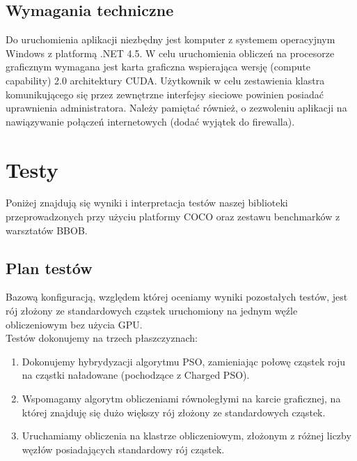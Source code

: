 \documentclass[12pt, twoside, openany, abstract=on]{report}
\theoremstyle{definition}
\begin{document}
\section{Wymagania techniczne}

Do uruchomienia aplikacji niezbędny jest komputer z systemem operacyjnym Windows z
platformą .NET 4.5. W celu uruchomienia obliczeń na procesorze graficznym wymagana jest karta graficzna wspierająca wersję (compute capability) 2.0 architektury CUDA.
Użytkownik w celu zestawienia klastra komunikującego się przez zewnętrzne interfejsy sieciowe powinien posiadać uprawnienia administratora. Należy pamiętać również, o zezwoleniu aplikacji na nawiązywanie połączeń internetowych (dodać wyjątek do firewalla).


\chapter{Testy}

Poniżej znajdują się wyniki i interpretacja testów naszej biblioteki przeprowadzonych przy użyciu platformy COCO oraz zestawu benchmarków z warsztatów BBOB.

\section{Plan testów}
Bazową konfiguracją, względem której oceniamy wyniki pozostałych testów, jest rój złożony ze standardowych cząstek uruchomiony na jednym węźle obliczeniowym bez użycia GPU.\\

Testów dokonujemy na trzech płaszczyznach:

\begin{enumerate}
\item{Dokonujemy hybrydyzacji algorytmu PSO, zamieniając połowę cząstek roju na cząstki naładowane (pochodzące z Charged PSO).}

\item{Wspomagamy algorytm obliczeniami równoległymi na karcie graficznej, na której znajduję się dużo większy rój złożony ze standardowych cząstek.}

\item{Uruchamiamy obliczenia na klastrze obliczeniowym, złożonym z różnej liczby węzłów posiadających standardowy rój cząstek.}
\end{enumerate}
\end{document}
